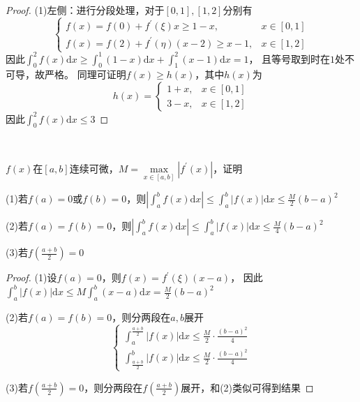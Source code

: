 \begin{proof}
  (1)左侧：进行分段处理，对于$[0,1],[1,2]$分别有
  \begin{equation*}
    \begin{cases}
      f(x) = f(0) + f^{\prime}(\xi) x \geq 1 - x , & x \in [0,1]\\
      f(x) = f(2) + f^{\prime}(\eta)(x-2) \geq x - 1, & x \in [1,2]
    \end{cases}
  \end{equation*}
  因此$\int_0^2 f(x)\mathrm{d} x \geq \int_0^1 (1 - x)\mathrm{d} x + \int_1^2 (x - 1)\mathrm{d} x = 1$，
  且等号取到时在$1$处不可导，故严格。
  同理可证明$f(x) \geq h(x)$，其中$h(x)$为
  \begin{equation*}
    h(x) =
    \begin{cases}
      1 + x, & x \in [0,1]\\
      3 - x, & x \in [1,2]
    \end{cases}
  \end{equation*}
  因此$\int_0^2 f(x)\mathrm{d} x \leq 3$
\end{proof}

~

\begin{exercise}[利用一阶导数研究积分]
  $f(x)$在$[a,b]$连续可微，$M = \max \limits_{x \in [a,b]}|f^{\prime}(x)|$，证明
  
  (1)若$f(a) = 0$或$f(b) = 0$，则$\left| \int_a^b f(x)\mathrm{d} x \right| \leq \int_a^b |f(x)| \mathrm{d} x \leq \frac{M}{2}(b-a)^2$

  (2)若$f(a) = f(b) = 0$，则$\left| \int_a^b f(x)\mathrm{d} x \right| \leq \int_a^b |f(x)|\mathrm{d} x \leq \frac{M}{4}(b-a)^2$

  (3)若$f \left( \frac{a+b}{2} \right) = 0$
\end{exercise}

\begin{proof}
  (1)设$f(a) = 0$，则$f(x) = f^{\prime}(\xi)(x-a)$，
  因此$\int_a^b |f(x)|\mathrm{d} x \leq M \int_a^b (x - a)\mathrm{d} x = \frac{M}{2}(b-a)^2$

  (2)若$f(a) = f(b) = 0$，则分两段在$a,b$展开
  \begin{equation*}
    \begin{cases}
      \int_a^{\frac{a+b}{2}}|f(x)|\mathrm{d} x \leq \frac{M}{2} \cdot \frac{(b-a)^2}{4}\\
      \int_{\frac{a+b}{2}}^b |f(x)|\mathrm{d} x \leq \frac{M}{2} \cdot \frac{(b-a)^2}{4}
    \end{cases}
  \end{equation*}

  (3)若$f \left( \frac{a+b}{2} \right) = 0$，则分两段在$f \left( \frac{a+b}{2} \right)$展开，和(2)类似可得到结果
\end{proof}

